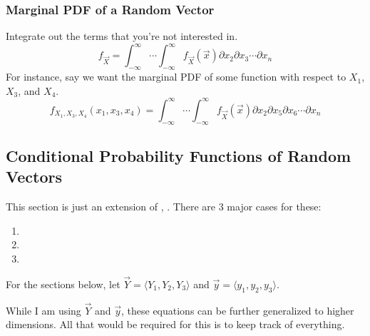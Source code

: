 		\subsubsection{Marginal PDF of a Random Vector} \label{subsubsec:Marginal PDF of Random Vector}
		Integrate out the terms that you're not interested in.
		\begin{equation} \label{eq:Marginal PDF of Random Vector}
			f_{\vec{X}} = \int_{-\infty}^{\infty} \cdots \int_{-\infty}^{\infty} f_{\vec{X}} \left( \vec{x} \right) \partial x_{2} \partial x_{3} \cdots \partial x_{n}
		\end{equation}
		For instance, say we want the marginal PDF of some function with respect to $X_{1}$, $X_{3}$, and $X_{4}$.
		\begin{equation} \label{eq:Marginal PDF of Random Vector Multiple Variables}
			f_{X_{1}, X_{3}, X_{4}} \left( x_{1}, x_{3}, x_{4} \right) = \int_{-\infty}^{\infty} \cdots \int_{-\infty}^{\infty} f_{\vec{X}} \left( \vec{x} \right) \partial x_{2} \partial x_{5} \partial x_{6} \cdots \partial x_{n}
		\end{equation}
	
	\subsection{Conditional Probability Functions of Random Vectors} \label{subsec:Random Vector Conditional Probability Functions}
	This section is just an extension of , .
	There are 3 major cases for these:
		\begin{enumerate}
			\item {}
			\item {}
			\item {}
		\end{enumerate}
	
		\begin{remark*} \label{rmk:Define Random Vector Y for Example}
			\begin{large}
				For the sections below, let $\vec{Y}= \langle Y_{1},Y_{2},Y_{3} \rangle$ and $\vec{y}= \langle y_{1},y_{2},y_{3} \rangle$.
			\end{large} \newline
			While I am using $\vec{Y}$ and $\vec{y}$, these equations can be further generalized to higher dimensions.
			All that would be required for this is to keep track of everything.
		\end{remark*}
	
